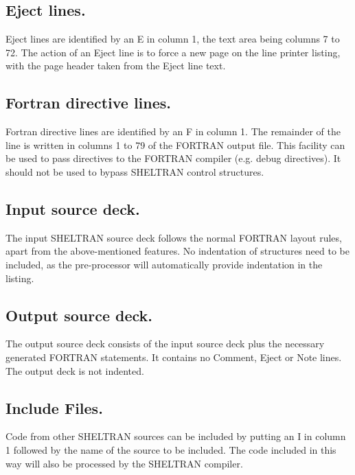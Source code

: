 \subsection{Eject lines.}

Eject lines are identified by an E in column 1, the text area being
columns 7 to 72.  The action of an Eject line is to force a new page on
the line printer listing, with the page header taken from the Eject line
text. 

\subsection{Fortran directive lines.}

Fortran directive lines are identified by an F in column 1.  The
remainder of the line is written in columns 1 to 79 of the FORTRAN
output file.  This facility can be used to pass directives to the
FORTRAN compiler (e.g.  debug directives).  It should not be used to
bypass SHELTRAN control structures. 

\subsection{Input source deck.}

The input SHELTRAN source deck follows the normal FORTRAN layout rules,
apart from the above-mentioned features.  No indentation of structures
need to be included, as the pre-processor will automatically provide
indentation in the listing. 

\subsection{Output source deck.}

The output source deck consists of the input source deck plus the
necessary generated FORTRAN statements.  It contains no Comment, Eject
or Note lines.  The output deck is not indented. 

\subsection{Include Files.}

Code from other SHELTRAN sources can be included by putting an I in
column 1 followed by the name of the source to be included.  The code
included in this way will also be processed by the SHELTRAN compiler. 

